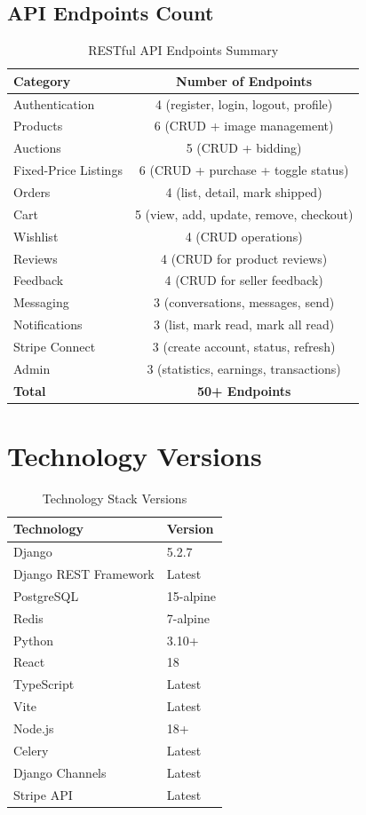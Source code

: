 \documentclass[12pt,a4paper]{article}
\begin{document}
\subsection{API Endpoints Count}
\begin{table}[H]
\centering
\begin{tabular}{|l|c|}
\hline
\textbf{Category} & \textbf{Number of Endpoints} \\
\hline
Authentication & 4 (register, login, logout, profile) \\
Products & 6 (CRUD + image management) \\
Auctions & 5 (CRUD + bidding) \\
Fixed-Price Listings & 6 (CRUD + purchase + toggle status) \\
Orders & 4 (list, detail, mark shipped) \\
Cart & 5 (view, add, update, remove, checkout) \\
Wishlist & 4 (CRUD operations) \\
Reviews & 4 (CRUD for product reviews) \\
Feedback & 4 (CRUD for seller feedback) \\
Messaging & 3 (conversations, messages, send) \\
Notifications & 3 (list, mark read, mark all read) \\
Stripe Connect & 3 (create account, status, refresh) \\
Admin & 3 (statistics, earnings, transactions) \\
\hline
\textbf{Total} & \textbf{50+ Endpoints} \\
\hline
\end{tabular}
\caption{RESTful API Endpoints Summary}
\end{table}

\section{Technology Versions}

\begin{table}[H]
\centering
\begin{tabular}{|l|l|}
\hline
\textbf{Technology} & \textbf{Version} \\
\hline
Django & 5.2.7 \\
Django REST Framework & Latest \\
PostgreSQL & 15-alpine \\
Redis & 7-alpine \\
Python & 3.10+ \\
React & 18 \\
TypeScript & Latest \\
Vite & Latest \\
Node.js & 18+ \\
Celery & Latest \\
Django Channels & Latest \\
Stripe API & Latest \\
\hline
\end{tabular}
\caption{Technology Stack Versions}
\end{table}
\end{document}
